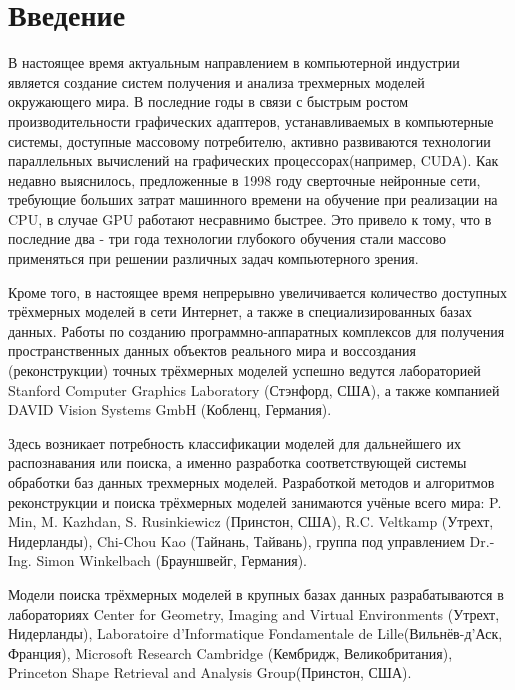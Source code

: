 \documentclass[14pt]{article}
\numberwithin{figure}{section}
\numberwithin{equation}{section}
\begin{document}


\tableofcontents

\newpage

\section*{Введение}

В настоящее время актуальным направлением в компьютерной индустрии является создание систем получения и анализа трехмерных моделей окружающего мира. В последние годы в связи с быстрым ростом производительности графических адаптеров, устанавливаемых в компьютерные системы, доступные массовому потребителю, активно развиваются технологии параллельных вычислений на графических процессорах(например, CUDA). Как недавно выяснилось, предложенные в 1998 году сверточные нейронные сети, требующие больших затрат машинного времени на обучение при реализации на CPU, в случае GPU работают несравнимо быстрее. Это привело к тому, что в последние два - три года технологии глубокого обучения стали массово применяться при решении различных задач компьютерного зрения.

Кроме того, в настоящее время непрерывно увеличивается количество доступных трёхмерных моделей в сети Интернет, а также в специализированных базах данных. %
Работы по созданию программно-аппаратных комплексов для получения пространственных данных объектов реального мира и воссоздания (реконструкции) точных трёхмерных моделей успешно ведутся лабораторией Stanford Computer Graphics Laboratory (Стэнфорд, США), а также компанией DAVID Vision Systems GmbH (Кобленц, Германия). %

Здесь возникает потребность классификации моделей для дальнейшего их распознавания или поиска, а именно разработка соответствующей системы обработки баз данных трехмерных моделей. %
Разработкой методов и алгоритмов реконструкции и поиска трёхмерных моделей занимаются учёные всего мира: P. Min, M. Kazhdan, S. Rusinkiewicz (Принстон, США), R.C. Veltkamp (Утрехт, Нидерланды), Chi-Chou Kao (Тайнань, Тайвань), группа под управлением Dr.-Ing. Simon Winkelbach (Брауншвейг, Германия).

Модели поиска трёхмерных моделей в крупных базах данных разрабатываются в лабораториях Center for Geometry, Imaging and Virtual Environments (Утрехт, Нидерланды), Laboratoire d'Informatique Fondamentale de Lille(Вильнёв-д’Аск, Франция), Microsoft Research Cambridge (Кембридж, Великобритания), Princeton Shape Retrieval and Analysis Group(Принстон, США).%
\end{document}
